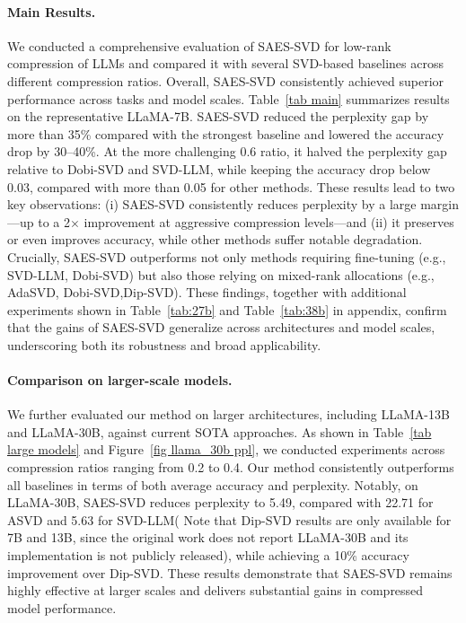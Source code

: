 
\vspace{-0.3cm}
\paragraph{Main Results.}
We conducted a comprehensive evaluation of SAES-SVD for low-rank compression of LLMs and compared it with several SVD-based baselines across different compression ratios. Overall, SAES-SVD consistently achieved superior performance across tasks and model scales.
Table~\ref{tab main} summarizes results on the representative LLaMA-7B. SAES-SVD reduced the perplexity gap by more than 35\% compared with the strongest baseline and lowered the accuracy drop by 30–40\%. At the more challenging 0.6 ratio, it halved the perplexity gap relative to Dobi-SVD and SVD-LLM, while keeping the accuracy drop below 0.03, compared with more than 0.05 for other methods. 
These results lead to two key observations: (i) SAES-SVD consistently reduces perplexity by a large margin—up to a 2$\times$ improvement at aggressive compression levels—and (ii) it preserves or even improves accuracy, while other methods suffer notable degradation. Crucially, SAES-SVD outperforms not only methods requiring fine-tuning (e.g., SVD-LLM, Dobi-SVD) but also those relying on mixed-rank allocations (e.g., AdaSVD, Dobi-SVD,Dip-SVD). 
These findings, together with additional experiments shown in Table~\ref{tab:27b} and Table~\ref{tab:38b} in appendix,  confirm that the gains of SAES-SVD generalize across architectures and model scales, underscoring both its robustness and broad applicability. 

\vspace{-0.3cm}
\paragraph{Comparison on larger-scale models.} We further evaluated our method on larger architectures, including LLaMA-13B and LLaMA-30B, against current SOTA approaches. As shown in Table~\ref{tab large models} and Figure~\ref{fig llama_30b ppl}, we conducted experiments across compression ratios ranging from 0.2 to 0.4. Our method consistently outperforms all baselines in terms of both average accuracy and perplexity. Notably, on LLaMA-30B, SAES-SVD reduces perplexity to 5.49, compared with 22.71 for ASVD and 5.63 for SVD-LLM( Note that Dip-SVD results are only available for 7B and 13B, since the original work does not report LLaMA-30B and its implementation is not publicly released), while achieving a 10\% accuracy improvement over Dip-SVD. These results demonstrate that SAES-SVD remains highly effective at larger scales and delivers substantial gains in compressed model performance.
\vspace{-0.3cm}

\vspace{-2mm}
